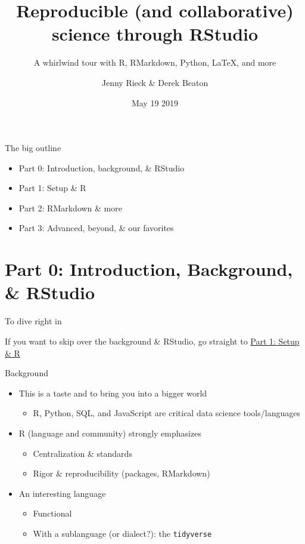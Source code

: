 \documentclass[
  ignorenonframetext,
]{beamer}
\title{Reproducible (and collaborative) science through RStudio}
\subtitle{A whirlwind tour with R, RMarkdown, Python, LaTeX, and more}
\author{Jenny Rieck \& Derek Beaton}
\date{May 19 2019}
\providecommand{\tightlist}{%
  \setlength{\itemsep}{0pt}\setlength{\parskip}{0pt}}
\begin{document}
\frame{\titlepage}

\begin{frame}{The big outline}
\protect\hypertarget{the-big-outline}{}

\begin{itemize}
\tightlist
\item
  Part 0: Introduction, background, \& RStudio
\item
  Part 1: Setup \& R
\item
  Part 2: RMarkdown \& more
\item
  Part 3: Advanced, beyond, \& our favorites
\end{itemize}

\end{frame}

\hypertarget{part-0-introduction-background-rstudio}{%
\section{Part 0: Introduction, Background, \&
RStudio}\label{part-0-introduction-background-rstudio}}

\begin{frame}{To dive right in}
\protect\hypertarget{to-dive-right-in}{}

If you want to skip over the background \& RStudio, go straight to
\protect\hyperlink{part-1-setup-r}{Part 1: Setup \& R}

\end{frame}

\begin{frame}[fragile]{Background}
\protect\hypertarget{background}{}

\begin{itemize}
\tightlist
\item
  This is a taste and to bring you into a bigger world

  \begin{itemize}
  \tightlist
  \item
    R, Python, SQL, and JavaScript are critical data science
    tools/languages
  \end{itemize}
\item
  R (language and community) strongly emphasizes

  \begin{itemize}
  \tightlist
  \item
    Centralization \& standards
  \item
    Rigor \& reproducibility (packages, RMarkdown)
  \end{itemize}
\item
  An interesting language

  \begin{itemize}
  \tightlist
  \item
    Functional
  \item
    With a sublanguage (or dialect?): the \texttt{tidyverse}
  \end{itemize}
\end{itemize}

\end{frame}
\end{document}
